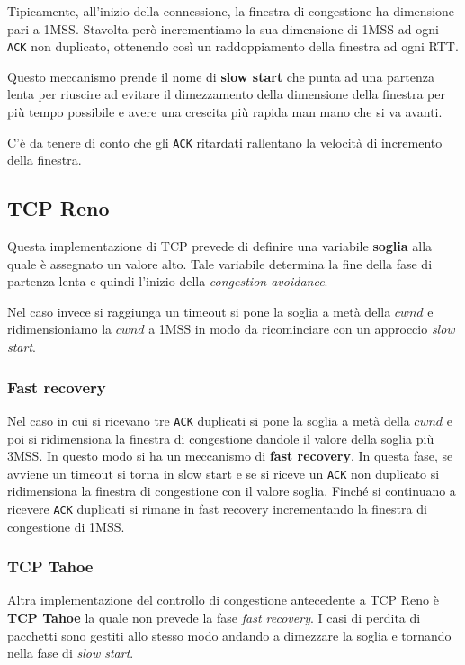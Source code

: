 Tipicamente, all'inizio della connessione, la finestra di congestione ha dimensione pari a 1MSS.
Stavolta però incrementiamo la sua dimensione di 1MSS ad ogni \verb|ACK| non duplicato, ottenendo
così un raddoppiamento della finestra ad ogni RTT.

Questo meccanismo prende il nome di \textbf{slow start} che punta ad una partenza lenta per 
riuscire ad evitare il dimezzamento della dimensione della finestra per più tempo possibile e
avere una crescita più rapida man mano che si va avanti.

C'è da tenere di conto che gli \verb|ACK| ritardati rallentano la velocità di incremento della
finestra.

\subsection{TCP Reno}
Questa implementazione di TCP prevede di definire una variabile \textbf{soglia} alla quale è 
assegnato un valore alto. Tale variabile determina la fine della fase di partenza lenta e quindi 
l'inizio della \emph{congestion avoidance}.

Nel caso invece si raggiunga un timeout si pone la soglia a metà della $cwnd$ e ridimensioniamo la
$cwnd$ a 1MSS in modo da ricominciare con un approccio \emph{slow start}.

\subsubsection{Fast recovery}
Nel caso in cui si ricevano tre \verb|ACK| duplicati si pone la soglia a metà della $cwnd$ e poi
si ridimensiona la finestra di congestione dandole il valore della soglia più 3MSS. In questo modo
si ha un meccanismo di \textbf{fast recovery}. In questa fase, se avviene un timeout si torna in 
slow start e se si riceve un \verb|ACK| non duplicato si ridimensiona la finestra di congestione
con il valore soglia. Finché si continuano a ricevere \verb|ACK| duplicati si rimane in fast 
recovery incrementando la finestra di congestione di 1MSS.

\subsubsection{TCP Tahoe}
Altra implementazione del controllo di congestione antecedente a TCP Reno è \textbf{TCP Tahoe} la
quale non prevede la fase \emph{fast recovery}. I casi di perdita di pacchetti sono gestiti allo 
stesso modo andando a dimezzare la soglia e tornando nella fase di \emph{slow start}.

